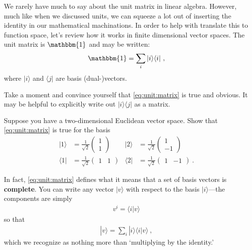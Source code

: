 We rarely have much to say about the unit matrix in linear algebra. However, much like when we discussed units, we can squeeze a lot out of inserting the identity in our mathematical machinations. In order to help with translate this to function space, let's review how it works in finite dimensional vector spaces. The unit matrix is $\mathbbm{1}$ and may be written:
\begin{align}
	\mathbbm{1} = \sum_i |i\rangle\langle i| \ ,
	\label{eq:unit:matrix}
\end{align}
where $|i\rangle$ and $\langle j|$ are basis (dual-)vectors. 
\begin{exercise}
Take a moment and convince yourself that \eqref{eq:unit:matrix} is true and obvious. It may be helpful to explicitly write out $|i\rangle \langle j|$ as a matrix. 
\end{exercise}
\begin{exercise}\label{ex:completeness:for:non:cartesian:basis}
Suppose you have a two-dimensional Euclidean vector space. Show that \eqref{eq:unit:matrix} is true for the basis
\begin{align}
	|1 \rangle &= 
	\frac{1}{\sqrt{2}}
	\begin{pmatrix}
	1 \\ 1
	\end{pmatrix}
	&
	|2 \rangle &= 
	\frac{1}{\sqrt{2}}
	\begin{pmatrix}
	1 \\ -1
	\end{pmatrix}
	\\
	\langle 1 | &= 
	\frac{1}{\sqrt{2}}
	\begin{pmatrix}
	1 & 1
	\end{pmatrix}
	&
	\langle 2 | &= 
	\frac{1}{\sqrt{2}}
	\begin{pmatrix}
	1 & -1
	\end{pmatrix} \ .
\end{align}
\end{exercise}
In fact, \eqref{eq:unit:matrix} defines what it means that a set of basis vectors is \textbf{complete}. You can write any vector $|v\rangle$ with respect to the basis $|i\rangle$---the components are simply
\begin{align}
	v^i = \langle i | v \rangle
\end{align}
so that 
\begin{align}
	|v\rangle = \sum_i |i\rangle \langle i | v \rangle \ ,
	\label{eq:completeness:by:inserting:1}
\end{align}
which we recognize as nothing more than `multiplying by the identity.' 
%

